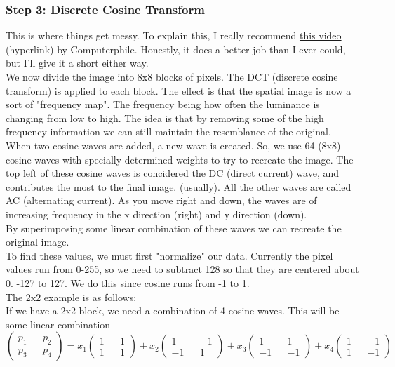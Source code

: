 \documentclass[12pt]{article}
\theoremstyle{definition}
\begin{document}
\subsubsection{Step 3: Discrete Cosine Transform}
This is where things get messy. To explain this, I really recommend \href{https://www.youtube.com/watch?v=Q2aEzeMDHMA}{this video} (hyperlink) by Computerphile. Honestly, it does a better job than I ever could, but I'll give it a short either way.
\\ \linebreak
We now divide the image into 8x8 blocks of pixels. The DCT (discrete cosine transform) is applied to each block. The effect is that the spatial image is now a sort of "frequency map". The frequency being how often the luminance is changing from low to high. The idea is that by removing some of the high frequency information we can still maintain the resemblance of the original.
\\ \linebreak
When two cosine waves are added, a new wave is created. So, we use 64 (8x8) cosine waves with specially determined weights to try to recreate the image. The top left of these cosine waves is concidered the DC (direct current) wave, and contributes the most to the final image. (usually). All the other waves are called AC (alternating current). As you move right and down, the waves are of increasing frequency in the x direction (right) and y direction (down).
\\ \linebreak
By superimposing some linear combination of these waves we can recreate the original image. 
\\ \linebreak
To find these values, we must first "normalize" our data. Currently the pixel values run from 0-255, so we need to subtract 128 so that they are centered about 0. -127 to 127. We do this since cosine runs from -1 to 1. 
\\ \linebreak
The 2x2 example is as follows:
\\
If we have a 2x2 block, we need a combination of 4 cosine waves. This will be some linear combination
$$\begin{pmatrix}
p_1 && p_2 \\
p_3 && p_4
\end{pmatrix} = x_1\begin{pmatrix}
1 && 1 \\ 1 && 1
\end{pmatrix} + x_2\begin{pmatrix}
1 && -1 \\ -1 && 1
\end{pmatrix} + x_3\begin{pmatrix}
1 && 1 \\ -1 && -1
\end{pmatrix} + x_4\begin{pmatrix}
1 && -1 \\ 1 && -1
\end{pmatrix}$$
\end{document}
